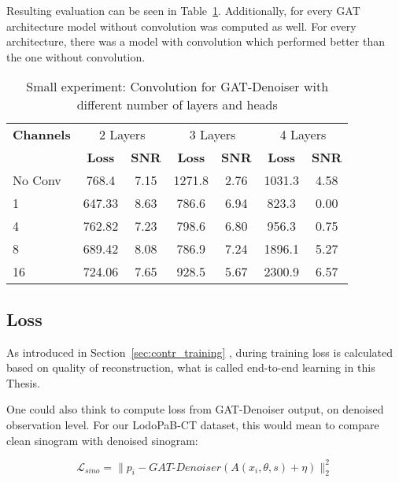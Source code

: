 Resulting evaluation can be seen in Table~\ref{tab:small_convolution_2}.
Additionally, for every GAT architecture model without convolution was computed as well.
For every architecture, there was a model with convolution which performed better than the one without convolution.


\begin{table}[H]
  \centering
  \begin{tabular}{l|cc|cc|cc}
    \toprule
    \textbf{Channels } & \multicolumn{2}{c|}{2 Layers} & \multicolumn{2}{c|}{3 Layers} & \multicolumn{2}{c}{4 Layers}  \\
                       & \textbf{Loss} & \textbf{SNR} & \textbf{Loss} & \textbf{SNR} & \textbf{Loss} & \textbf{SNR} \\ 
    \midrule
		No Conv & 768.4  & 7.15 & 1271.8 & 2.76 & 1031.3 & 4.58 \\ \hline
		1       & 647.33 & 8.63 & 786.6  & 6.94 & 823.3  & 0.00 \\ \hline
		4       & 762.82 & 7.23 & 798.6  & 6.80 & 956.3  & 0.75 \\ \hline
		8       & 689.42 & 8.08 & 786.9  & 7.24 & 1896.1 & 5.27 \\ \hline
		16      & 724.06 & 7.65 & 928.5  & 5.67 & 2300.9 & 6.57 \\

    \midrule
  \end{tabular}

  \caption{Small experiment: Convolution for GAT-Denoiser with different number of layers and heads}
  \label{tab:small_convolution_2}
\end{table}



\subsection{Loss}
As introduced in Section~\ref{sec:contr_training} \textit{},
during training loss is calculated based on quality of reconstruction, what is called
end-to-end learning in this Thesis.

One could also think to compute loss from GAT-Denoiser output, on denoised observation level.
For our LodoPaB-CT dataset, this would mean to compare clean sinogram with denoised sinogram:

\begin{equation}
  \label{eq:loss_sino}
  \mathcal{L}_{sino} = \parallel p_i - \textit{GAT-Denoiser}(A(x_i, \theta, s) + \eta) \parallel ^2_2
\end{equation}

